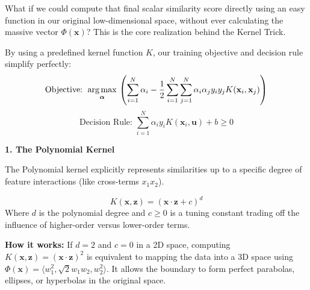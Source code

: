 
What if we could compute that final scalar similarity score directly using an easy function in our original low-dimensional space, without ever calculating the massive vector $\Phi(\mathbf{x})$? This is the core realization behind the Kernel Trick.


By using a predefined kernel function $K$, our training objective and decision rule simplify perfectly:
\[
\text{Objective: } \mathop{\mathrm{arg\,max}}_{\boldsymbol{\alpha}}\, \left( \sum_{i=1}^{N} \alpha_i - \frac{1}{2} \sum_{i=1}^{N} \sum_{j=1}^{N} \alpha_i \alpha_j y_i y_j K(\mathbf{x}_i, \mathbf{x}_j) \right)
\]
\[
\text{Decision Rule: } \sum_{i=1}^{N} \alpha_i y_i K(\mathbf{x}_i, \mathbf{u}) + b \geq 0
\]



\textbf{1. The Polynomial Kernel}

The Polynomial kernel explicitly represents similarities up to a specific degree of feature interactions (like cross-terms $x_1x_2$).

\begin{tcolorbox}[colback=blue!5!white,colframe=blue!75!black,title=Polynomial Kernel Formula]
\[
K(\mathbf{x}, \mathbf{z}) = (\mathbf{x} \cdot \mathbf{z} + c)^d
\]
Where $d$ is the polynomial degree and $c \geq 0$ is a tuning constant trading off the influence of higher-order versus lower-order terms.
\end{tcolorbox}

\textbf{How it works:} If $d=2$ and $c=0$ in a 2D space, computing $K(\mathbf{x}, \mathbf{z}) = (\mathbf{x} \cdot \mathbf{z})^2$ is equivalent to mapping the data into a 3D space using $\Phi(\mathbf{x}) = \langle w_1^2, \sqrt{2}w_1w_2, w_2^2 \rangle$. It allows the boundary to form perfect parabolas, ellipses, or hyperbolas in the original space.

